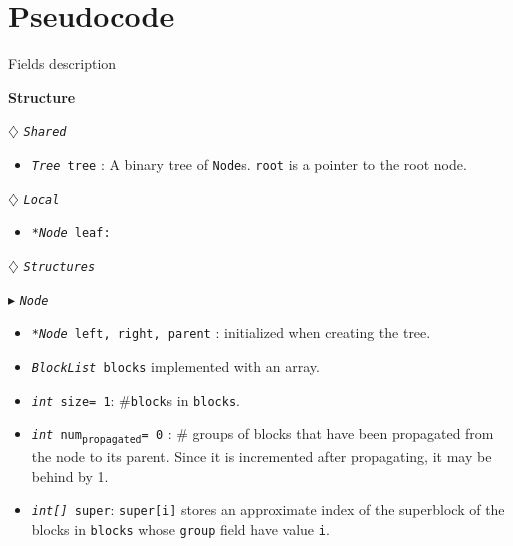 \documentclass[10pt]{article}
\newcommand{\sub}[1]{\textsubscript{#1}}
\renewcommand{\tt}[1]{\texttt{#1}}
\renewcommand{\sl}[1]{\textsl{#1}}
\renewcommand{\bf}[1]{\textbf{#1}}
\theoremstyle{definition}
\begin{document}
\section{Pseudocode}

\begin{algorithm}
\caption{Fields description}
\begin{algorithmic}[1]
\setcounter{ALG@line}{100}
\begin{multicols}{2}

\Statex \bf{Structure}

\Statex $\diamondsuit$ \tt{\sl{Shared}}
\begin{itemize}
\item \tt{\sl{Tree} tree} \textsf{: A binary tree of \tt{Node}s. \tt{root} is a pointer to the root node.}
\end{itemize}

\Statex

\Statex $\diamondsuit$ \tt{\sl{Local}}
\begin{itemize}
\item \tt{\sl{*Node} leaf:} 
\end{itemize}

\Statex
\Statex $\diamondsuit$ \tt{\sl{Structures}}

\Statex $\blacktriangleright$ \tt{\sl{Node}}
\begin{itemize}
\item \tt{\sl{*Node} left, right, parent} \textsf{: initialized  when creating the tree.}
\item \tt{\sl{BlockList} blocks}
  \textsf{ implemented with an array.}
\item \tt{\sl{int} size= 1}\textsf{: \#\tt{block}s in \tt{blocks}.}
\item \tt{\sl{int} num\sub{propagated}= 0}\textsf{} \textsf{: \# groups of blocks that have been propagated from the node to its parent. Since it is incremented after propagating, it may be behind by 1.}
\item \tt{\sl{int[]} super}\textsf{: \tt{super[i]} stores an approximate index of the superblock of the blocks in \tt{blocks} whose \tt{group} field have value \tt{i}.}
\end{itemize}

%  
%
%  


\end{multicols}
\end{algorithmic}
\end{algorithm}
\end{document}
